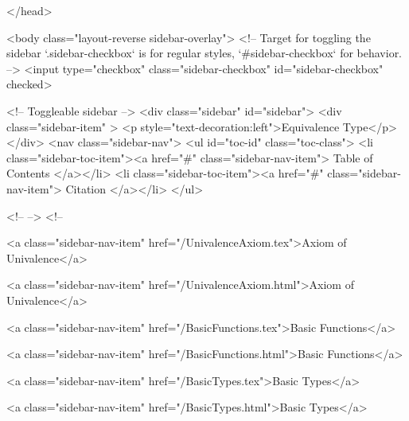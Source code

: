   
</head>




  <body class="layout-reverse sidebar-overlay">
    <!-- Target for toggling the sidebar `.sidebar-checkbox` is for regular
     styles, `#sidebar-checkbox` for behavior. -->
<input type="checkbox" class="sidebar-checkbox" id="sidebar-checkbox" checked>

<!-- Toggleable sidebar -->
<div class="sidebar" id="sidebar">
  <div class="sidebar-item" >
    <p style="text-decoration:left">Equivalence Type</p>
  </div>
  <nav class="sidebar-nav">
    <ul id="toc-id" class="toc-class">
  <li class="sidebar-toc-item"><a href="#" class="sidebar-nav-item"> Table of Contents </a></li>
  <li class="sidebar-toc-item"><a href="#" class="sidebar-nav-item"> Citation </a></li>
</ul>


    <!--  -->
    <!-- 
      
    
      
    
      
    
      
    
      
        
      
    
      
        
          <a class="sidebar-nav-item" href="/UnivalenceAxiom.tex">Axiom of Univalence</a>
        
      
    
      
        
          <a class="sidebar-nav-item" href="/UnivalenceAxiom.html">Axiom of Univalence</a>
        
      
    
      
        
          <a class="sidebar-nav-item" href="/BasicFunctions.tex">Basic Functions</a>
        
      
    
      
        
          <a class="sidebar-nav-item" href="/BasicFunctions.html">Basic Functions</a>
        
      
    
      
        
          <a class="sidebar-nav-item" href="/BasicTypes.tex">Basic Types</a>
        
      
    
      
        
          <a class="sidebar-nav-item" href="/BasicTypes.html">Basic Types</a>
        
      
    
